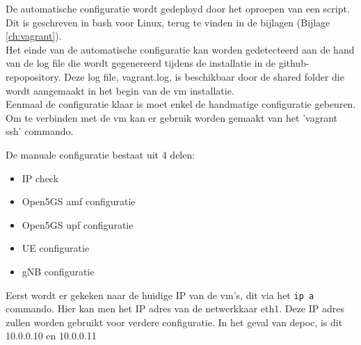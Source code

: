 De automatische configuratie wordt gedeployd door het oproepen van een script. Dit is geschreven in bash voor Linux, terug te vinden in de bijlagen (Bijlage \ref{ch:vagrant}).\\

Het einde van de automatische configuratie kan worden gedetecteerd aan de hand van de log file die wordt gegenereerd tijdens de installatie in de github-repopository. Deze log file, vagrant.log, is beschikbaar door de shared folder die wordt aangemaakt in het begin van de \gls{vm} installatie. \\

Eenmaal de configuratie klaar is moet enkel de handmatige configuratie gebeuren.
Om te verbinden met de \gls{vm} kan er gebruik worden gemaakt van het 'vagrant ssh' commando.

De manuale configuratie bestaat uit 4 delen:

\begin{itemize}
    \item IP check
    \item Open5GS \gls{amf} configuratie
    \item Open5GS \gls{upf} configuratie
    \item UE configuratie
    \item gNB configuratie
\end{itemize}

Eerst wordt er gekeken naar de huidige IP van de \gls{vm}'s, dit via het \lstinline!ip a! commando. Hier kan men het IP adres van de netwerkkaar eth1. Deze IP adres zullen worden gebruikt voor verdere configuratie. In het geval van de\gls{poc}, is dit 10.0.0.10 en 10.0.0.11

